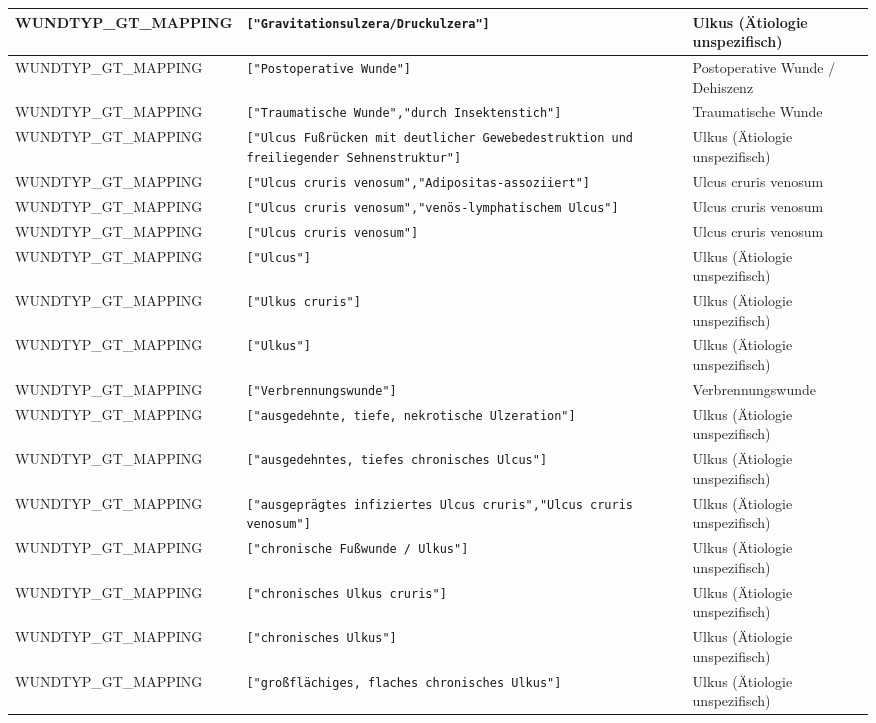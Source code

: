 \begin{longtable}{|p{3.5cm}|p{5cm}|p{6.5cm}|}
WUNDTYP\_GT\_MAPPING & \texttt{["Gravitationsulzera/Druckulzera"]} & Ulkus (Ätiologie unspezifisch) \\ \hline
WUNDTYP\_GT\_MAPPING & \texttt{["Postoperative Wunde"]} & Postoperative Wunde / Dehiszenz \\ \hline
WUNDTYP\_GT\_MAPPING & \texttt{["Traumatische Wunde","durch Insektenstich"]} & Traumatische Wunde \\ \hline
WUNDTYP\_GT\_MAPPING & \texttt{["Ulcus Fußrücken mit deutlicher Gewebedestruktion und freiliegender Sehnenstruktur"]} & Ulkus (Ätiologie unspezifisch) \\ \hline
WUNDTYP\_GT\_MAPPING & \texttt{["Ulcus cruris venosum","Adipositas-assoziiert"]} & Ulcus cruris venosum \\ \hline
WUNDTYP\_GT\_MAPPING & \texttt{["Ulcus cruris venosum","venös-lymphatischem Ulcus"]} & Ulcus cruris venosum \\ \hline
WUNDTYP\_GT\_MAPPING & \texttt{["Ulcus cruris venosum"]} & Ulcus cruris venosum \\ \hline
WUNDTYP\_GT\_MAPPING & \texttt{["Ulcus"]} & Ulkus (Ätiologie unspezifisch) \\ \hline
WUNDTYP\_GT\_MAPPING & \texttt{["Ulkus cruris"]} & Ulkus (Ätiologie unspezifisch) \\ \hline
WUNDTYP\_GT\_MAPPING & \texttt{["Ulkus"]} & Ulkus (Ätiologie unspezifisch) \\ \hline
WUNDTYP\_GT\_MAPPING & \texttt{["Verbrennungswunde"]} & Verbrennungswunde \\ \hline
WUNDTYP\_GT\_MAPPING & \texttt{["ausgedehnte, tiefe, nekrotische Ulzeration"]} & Ulkus (Ätiologie unspezifisch) \\ \hline
WUNDTYP\_GT\_MAPPING & \texttt{["ausgedehntes, tiefes chronisches Ulcus"]} & Ulkus (Ätiologie unspezifisch) \\ \hline
WUNDTYP\_GT\_MAPPING & \texttt{["ausgeprägtes infiziertes Ulcus cruris","Ulcus cruris venosum"]} & Ulkus (Ätiologie unspezifisch) \\ \hline
WUNDTYP\_GT\_MAPPING & \texttt{["chronische Fußwunde / Ulkus"]} & Ulkus (Ätiologie unspezifisch) \\ \hline
WUNDTYP\_GT\_MAPPING & \texttt{["chronisches Ulkus cruris"]} & Ulkus (Ätiologie unspezifisch) \\ \hline
WUNDTYP\_GT\_MAPPING & \texttt{["chronisches Ulkus"]} & Ulkus (Ätiologie unspezifisch) \\ \hline
WUNDTYP\_GT\_MAPPING & \texttt{["großflächiges, flaches chronisches Ulkus"]} & Ulkus (Ätiologie unspezifisch) \\ \hline

\end{longtable}
